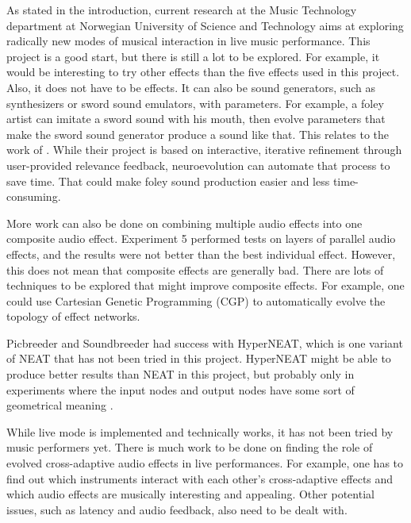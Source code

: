 As stated in the introduction, current research at the Music Technology department at Norwegian University of Science and Technology aims at exploring radically new modes of musical interaction in live music performance. This project is a good start, but there is still a lot to be explored. For example, it would be interesting to try other effects than the five effects used in this project. Also, it does not have to be effects. It can also be sound generators, such as synthesizers or sword sound emulators, with parameters. For example, a foley artist can imitate a sword sound with his mouth, then evolve parameters that make the sword sound generator produce a sound like that. This relates to the work of \cite{cartwright2014}. While their project is based on interactive, iterative refinement through user-provided relevance feedback, neuroevolution can automate that process to save time. That could make foley sound production easier and less time-consuming.

More work can also be done on combining multiple audio effects into one composite audio effect. Experiment 5 performed tests on layers of parallel audio effects, and the results were not better than the best individual effect. However, this does not mean that composite effects are generally bad. There are lots of techniques to be explored that might improve composite effects. For example, one could use Cartesian Genetic Programming (CGP) to automatically evolve the topology of effect networks.

Picbreeder \citep{secretan2008} and Soundbreeder \citep{ye2014} had success with HyperNEAT, which is one variant of NEAT that has not been tried in this project. HyperNEAT might be able to produce better results than NEAT in this project, but probably only in experiments where the input nodes and output nodes have some sort of geometrical meaning \citep{whiteson2013}.

While live mode is implemented and technically works, it has not been tried by music performers yet. There is much work to be done on finding the role of evolved cross-adaptive audio effects in live performances. For example, one has to find out which instruments interact with each other's cross-adaptive effects and which audio effects are musically interesting and appealing. Other potential issues, such as latency and audio feedback, also need to be dealt with.

